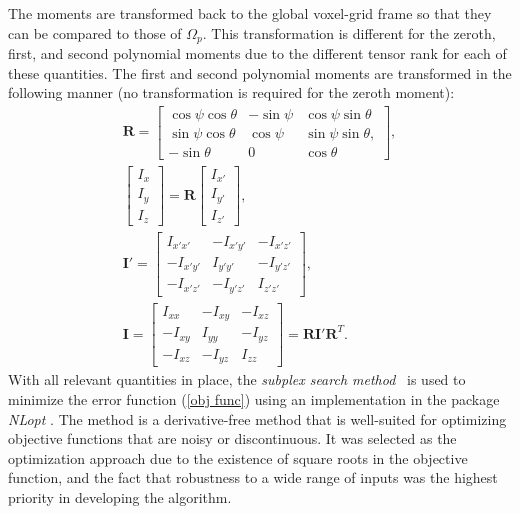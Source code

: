 The moments are transformed back to the global voxel-grid frame so that they can be compared to those of $\Omega_p$. This transformation is different for the zeroth, first, and second polynomial moments due to the different tensor rank for each of these quantities. The first and second polynomial moments are transformed in the following manner (no transformation is required for the zeroth moment):
\begin{gather}
\bm{R} = \left[\begin{array} {ccc} {\cos\psi\cos\theta} & {-\sin\psi} & {\cos\psi\sin\theta}\\ {\sin\psi\cos\theta} & {\cos\psi} & {\sin\psi\sin\theta}, \\
{-\sin\theta} & {0} & {\cos\theta}\end{array} \right], \\
\left[\begin{array} {ccc} {I_x} \\ {I_y} \\ {I_z} \end{array} \right] = \bm{R} \left[\begin{array} {ccc} {I_{x'}} \\ {I_{y'}} \\ {I_{z'}} \end{array} \right], \\
\bm{I}' = \left[\begin{array} {ccc} {I_{x'x'}} & {-I_{x'y'}} & {-I_{x'z'}}\\ {-I_{x'y'}} & {I_{y'y'}} & {-I_{y'z'}} \\ -{I_{x'z'}} & {-I_{y'z'}} & {I_{z'z'}} \end{array} \right], \\
\bm{I} = \left[\begin{array} {ccc} {I_{xx}} & {-I_{xy}} & {-I_{xz}}\\ {-I_{xy}} & {I_{yy}} & {-I_{yz}} \\ -{I_{xz}} & {-I_{yz}} & {I_{zz}} \end{array} \right] = \bm{R}\bm{I}'\mathbf{R}^T.
\end{gather}
\noindent With all relevant quantities in place, the \textit{subplex search method}~\cite{rowan} is used to minimize the error function (\ref{obj func}) using an implementation in the package \textit{NLopt} \cite{nlo}. The method is a derivative-free method that is well-suited for optimizing objective functions that are noisy or discontinuous. It was selected as the optimization approach due to the existence of square roots in the objective function, and the fact that robustness to a wide range of inputs was the highest priority in developing the algorithm. \\ \\
